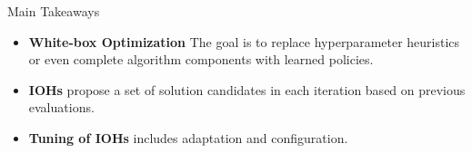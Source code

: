 \documentclass[main]{subfiles}
\begin{document}
\begin{frame}{Main Takeaways} 


\begin{itemize}
    \item \textbf{White-box Optimization} The goal is to replace hyperparameter heuristics or even complete algorithm components
with learned policies.
    \item \textbf{IOHs} propose a set of solution candidates in each
iteration based on previous evaluations.
    \item \textbf{Tuning of IOHs} includes adaptation and configuration.
\end{itemize}

 \end{frame}


	

\end{document}
